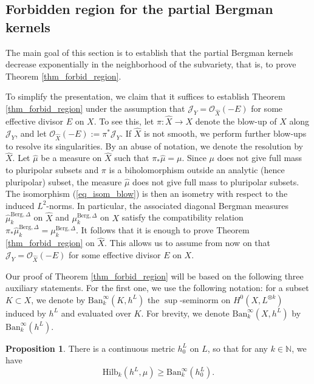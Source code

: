 \documentclass[12pt]{article}
\numberwithin{equation}{section}
\theoremstyle{theorem}
\theoremstyle{definition}
\newtheorem{prop}[thm]{Proposition}
\theoremstyle{remark}
\newcommand{\nat}{\mathbb{N}}
\begin{document}
	\subsection{Forbidden region for the partial Bergman kernels}\label{sect_forbid}
	The main goal of this section is to establish that the partial Bergman kernels decrease exponentially in the neighborhood of the subvariety, that is, to prove Theorem \ref{thm_forbid_region}.
	\par 
	To simplify the presentation, we claim that it suffices to establish Theorem \ref{thm_forbid_region} under the assumption that $\mathcal{J}_Y = \mathscr{O}_{\hat{X}}(-E)$ for some effective divisor $E$ on $X$.
	To see this, let $\pi : \hat{X} \to X$ denote the blow-up of $X$ along $\mathcal{J}_Y$, and let $\mathscr{O}_{\hat{X}}(-E) := \pi^* \mathcal{J}_Y$.  
	If $\hat{X}$ is not smooth, we perform further blow-ups to resolve its singularities.	
	By an abuse of notation, we denote the resolution by $\hat{X}$.
	Let $\hat{\mu}$ be a measure on $\hat{X}$ such that $\pi_* \hat{\mu} = \mu$.  
	Since $\mu$ does not give full mass to pluripolar subsets and $\pi$ is a biholomorphism outside an analytic (hence pluripolar) subset, the measure $\hat{\mu}$ does not give full mass to pluripolar subsets.
	The isomorphism (\ref{eq_isom_blow}) is then an isometry with respect to the induced $L^2$-norms.  
	In particular, the associated diagonal Bergman measures $\hat{\mu}_k^{\mathrm{Berg}, \Delta}$ on $\hat{X}$ and $\mu_k^{\mathrm{Berg}, \Delta}$ on $X$ satisfy the compatibility relation $\pi_* \hat{\mu}_k^{\mathrm{Berg}, \Delta} = \mu_k^{\mathrm{Berg}, \Delta}$.  
	It follows that it is enough to prove Theorem \ref{thm_forbid_region} on $\hat{X}$.
	This allows us to assume from now on that $\mathcal{J}_Y = \mathscr{O}_{\hat{X}}(-E)$ for some effective divisor $E$ on $X$.
	\par 
	Our proof of Theorem \ref{thm_forbid_region} will be based on the following three auxiliary statements.
	For the first one, we use the following notation: for a subset $K \subset X$, we denote by ${\textrm{Ban}}_k^{\infty}(K, h^L)$ the $\sup$-seminorm on $H^0(X, L^{\otimes k})$ induced by $h^L$ and evaluated over $K$. 
	For brevity, we denote ${\textrm{Ban}}_k^{\infty}(X, h^L)$ by ${\textrm{Ban}}_k^{\infty}(h^L)$.
	\begin{prop}\label{lem_asympt_bm}
		There is a continuous metric $h^L_0$ on $L$, so that for any $k \in \nat$, we have
		\begin{equation}\label{eq_asympt_bm}
			{\textrm{Hilb}}_k(h^L, \mu)
			\geq
			{\textrm{Ban}}_k^{\infty}(h^L_0).
		\end{equation}
	\end{prop}
\end{document}
